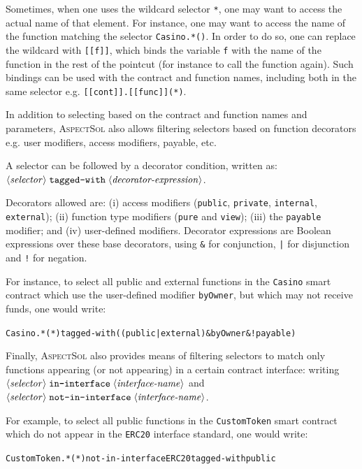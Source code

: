 \documentclass{article}
\newcommand{\AspectSol}{\textsc{AspectSol}\xspace}
\newcommand{\variable}[1]{\ensuremath{\langle\textrm{\textit{#1}}\rangle}}
\begin{document}
Sometimes, when one uses the wildcard selector \texttt{*}, one may want to access the actual name of that element. For instance, one may want to access the name of the function matching the selector \texttt{Casino.*()}. In order to do so, one can replace the wildcard with \texttt{[[f]]}, which binds the variable \texttt{f} with the name of the function in the rest of the pointcut (for instance to call the function again). Such bindings can be used with the contract and function names, including both in the same selector e.g. \texttt{[[cont]].[[func]](*)}.

In addition to selecting based on the contract and function names and parameters, \AspectSol also allows filtering selectors based on function decorators e.g. user modifiers, access modifiers, payable, etc. 

A selector can be followed by a decorator condition, written as: $\variable{selector}\;\texttt{tagged-with}\;\variable{decorator-expression}$.

Decorators allowed are: (i) access  modifiers (\texttt{public}, \texttt{private}, \texttt{internal}, \texttt{external}); (ii) function type modifiers (\texttt{pure} and \texttt{view}); (iii) the \texttt{payable} modifier; and (iv) user-defined modifiers. Decorator expressions are Boolean expressions over these base decorators, using 
 \texttt{\&} for conjunction, \texttt{|} for disjunction and \texttt{!} for negation. 
 
For instance, to select all public and external functions in the \texttt{Casino} smart contract which use the user-defined modifier \texttt{byOwner}, but which may not receive funds, one would write:
	
\begin{alltt}
Casino.*(*) tagged-with ((public | external) \& byOwner \& !payable)
\end{alltt}	

Finally, \AspectSol also provides means of filtering selectors to match only functions appearing (or not appearing) in a certain contract interface: writing $\variable{selector}\;\texttt{in-interface}\;\variable{interface-name}$ and $\variable{selector}\;\texttt{not-in-interface}\;\variable{interface-name}$.

For example, to select all public functions in the \texttt{CustomToken} smart contract which do not appear in the \texttt{ERC20} interface standard, one would write:
	
\begin{alltt}
CustomToken.*(*) not-in-interface ERC20 tagged-with public
\end{alltt}
	
\end{document}
